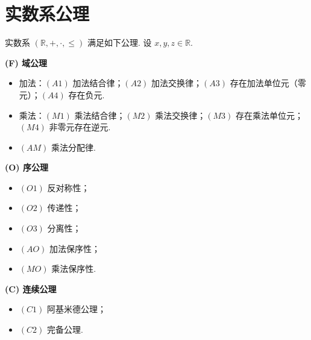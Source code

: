 \section{实数系公理}

实数系 $(\mathbb{R}, +, \cdot, \le)$ 满足如下公理. 设 $x,y,z \in \mathbb{R}$. 

\textbf{(F) 域公理}
\begin{itemize}
    \item 加法：\((A1)\) 加法结合律；\((A2)\) 加法交换律；\((A3)\) 存在加法单位元（零元）；\((A4)\) 存在负元. 
    \item 乘法：\((M1)\) 乘法结合律；\((M2)\) 乘法交换律；\((M3)\) 存在乘法单位元；\((M4)\) 非零元存在逆元. 
    \item \((AM)\) 乘法分配律. 
\end{itemize}

\textbf{(O) 序公理}
\begin{itemize}
    \item \((O1)\) 反对称性；
    \item \((O2)\) 传递性；
    \item \((O3)\) 分离性；
    \item \((AO)\) 加法保序性；
    \item \((MO)\) 乘法保序性. 
\end{itemize}

\textbf{(C) 连续公理}
\begin{itemize}
    \item \((C1)\) 阿基米德公理；
    \item \((C2)\) 完备公理. 
\end{itemize}
